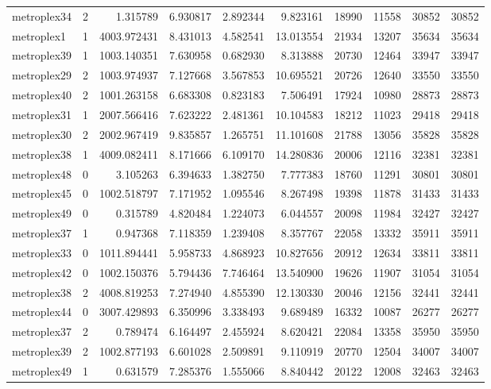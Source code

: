 \begin{longtable}{|l|r|r|r|r|r|r|r|r|r|}
metroplex34 & 2 & 1.315789 & 6.930817 & 2.892344 & 9.823161 & 18990 & 11558 & 30852 & 30852 \\
metroplex1 & 1 & 4003.972431 & 8.431013 & 4.582541 & 13.013554 & 21934 & 13207 & 35634 & 35634 \\
metroplex39 & 1 & 1003.140351 & 7.630958 & 0.682930 & 8.313888 & 20730 & 12464 & 33947 & 33947 \\
metroplex29 & 2 & 1003.974937 & 7.127668 & 3.567853 & 10.695521 & 20726 & 12640 & 33550 & 33550 \\
metroplex40 & 2 & 1001.263158 & 6.683308 & 0.823183 & 7.506491 & 17924 & 10980 & 28873 & 28873 \\
metroplex31 & 1 & 2007.566416 & 7.623222 & 2.481361 & 10.104583 & 18212 & 11023 & 29418 & 29418 \\
metroplex30 & 2 & 2002.967419 & 9.835857 & 1.265751 & 11.101608 & 21788 & 13056 & 35828 & 35828 \\
metroplex38 & 1 & 4009.082411 & 8.171666 & 6.109170 & 14.280836 & 20006 & 12116 & 32381 & 32381 \\
metroplex48 & 0 & 3.105263 & 6.394633 & 1.382750 & 7.777383 & 18760 & 11291 & 30801 & 30801 \\
metroplex45 & 0 & 1002.518797 & 7.171952 & 1.095546 & 8.267498 & 19398 & 11878 & 31433 & 31433 \\
metroplex49 & 0 & 0.315789 & 4.820484 & 1.224073 & 6.044557 & 20098 & 11984 & 32427 & 32427 \\
metroplex37 & 1 & 0.947368 & 7.118359 & 1.239408 & 8.357767 & 22058 & 13332 & 35911 & 35911 \\
metroplex33 & 0 & 1011.894441 & 5.958733 & 4.868923 & 10.827656 & 20912 & 12634 & 33811 & 33811 \\
metroplex42 & 0 & 1002.150376 & 5.794436 & 7.746464 & 13.540900 & 19626 & 11907 & 31054 & 31054 \\
metroplex38 & 2 & 4008.819253 & 7.274940 & 4.855390 & 12.130330 & 20046 & 12156 & 32441 & 32441 \\
metroplex44 & 0 & 3007.429893 & 6.350996 & 3.338493 & 9.689489 & 16332 & 10087 & 26277 & 26277 \\
metroplex37 & 2 & 0.789474 & 6.164497 & 2.455924 & 8.620421 & 22084 & 13358 & 35950 & 35950 \\
metroplex39 & 2 & 1002.877193 & 6.601028 & 2.509891 & 9.110919 & 20770 & 12504 & 34007 & 34007 \\
metroplex49 & 1 & 0.631579 & 7.285376 & 1.555066 & 8.840442 & 20122 & 12008 & 32463 & 32463 \\

\end{longtable}
